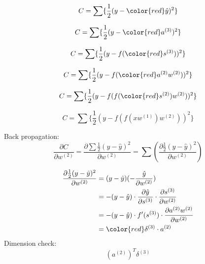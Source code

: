 \documentclass[12pt]{article}
\begin{document}
\begin{equation}
C = \sum \{\frac{1}{2}(y-{\color{red}\hat{y}})^2\}
\end{equation}

\begin{equation}
C = \sum\{\frac{1}{2}(y-{\color{red}a^{(3)}})^2 \}
\end{equation}

\begin{equation}
C = \sum\{\frac{1}{2}(y-f({\color{red}s^{(3)}}))^2\}
\end{equation}

\begin{equation}
C = \sum\{\frac{1}{2}(y-f({\color{red}a^{(2)}}w^{(2)}))^2\}
\end{equation}

\begin{equation}
C = \sum\{\frac{1}{2}(y-f(f({\color{red}s^{(2)}})w^{(2)}))^2\}
\end{equation}

\begin{equation}
C = \sum\{\frac{1}{2}(y-f(f(xw^{(1)})w^{(2)}))^2\}
\end{equation}

Back propagation:
\begin{equation}
\frac{\partial C}{\partial w^{(2)}} = \frac{\partial \sum \frac{1}{2}(y-\hat{y})^2}{\partial w^{(2)}} = \sum (\frac{\partial \frac{1}{2}(y-\hat{y})^2}{\partial w^{(2)}})
\end{equation}


\begin{equation}
    \begin{split}
    \frac{\partial \frac{1}{2}(y-\hat{y})^2}{\partial w^{(2)}} 
	& =(y-\hat{y})(-\frac{\hat{y}}{\partial w^{(2)}}) \\
	& = -(y-\hat{y}) \cdot \frac{\partial \hat{y}}{\partial s^{(3)}}\cdot \frac{\partial 	s^{(3)}}{\partial w^{(2)}}\\	
	& = -(y-\hat{y}) \cdot f'(s^{(3)})\cdot
	\frac{\partial a^{(2)}w^{(2)}}{\partial w^{(2)}}\\
	& = {\color{red} \delta^{(3)} \cdot a^{(2)}}
    \end{split}
\end{equation}
Dimension check:
\begin{equation}
(a^{(2)})^T \delta^{(3)}
\end{equation}
\end{document}
